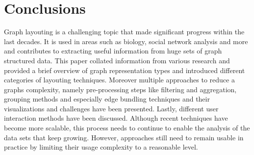\section{Conclusions}
Graph layouting is a challenging topic that made significant progress within the last decades. It is used in areas such as biology, social network analysis and more and contributes to extracting useful information from huge sets of graph structured data. This paper collated information from various research and provided a brief overview of graph representation types and introduced different categories of layouting techniques. Moreover multiple approaches to reduce a graphs complexity, namely pre-processing steps like filtering and aggregation, grouping methods and especially edge bundling techniques and their visualizations and challenges have been presented. Lastly, different user interaction methods have been discussed. Although recent techniques have become more scalable, this process needs to continue to enable the analysis of the data sets that keep growing. However, approaches still need to remain usable in practice by limiting their usage complexity to a reasonable level.



%









